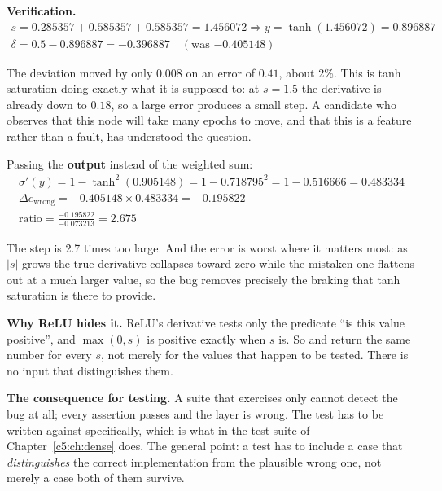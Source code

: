 \textbf{Verification.}
\begin{gather*}
  s = 0.285357 + 0.585357 + 0.585357 = 1.456072 \Rightarrow y = \tanh(1.456072) = 0.896887 \\
  \delta = 0.5 - 0.896887 = \mathbf{-0.396887} \quad (\text{was } {-0.405148})
\end{gather*}

The deviation moved by only $0.008$ on an error of $0.41$, about 2\%. This is tanh saturation doing
exactly what it is supposed to: at $s = 1.5$ the derivative is already down to $0.18$, so a large
error produces a small step. A candidate who observes that this node will take many epochs to move,
and that this is a feature rather than a fault, has understood the question.

Passing the \textbf{output} instead of the weighted sum:
\begin{gather*}
  \sigma'(y) = 1 - \tanh^2(0.905148) = 1 - 0.718795^2 = 1 - 0.516666 = \mathbf{0.483334} \\
  \Delta e_{\mathrm{wrong}} = -0.405148 \times 0.483334 = \mathbf{-0.195822} \\
  \text{ratio} = \frac{-0.195822}{-0.073213} = \mathbf{2.675}
\end{gather*}

The step is 2.7 times too large. And the error is worst where it matters most: as
$\lvert s \rvert$ grows the true derivative collapses toward zero while the mistaken one flattens
out at a much larger value, so the bug removes precisely the braking that tanh saturation is there
to provide.

\textbf{Why ReLU hides it.} ReLU's derivative tests only the predicate ``is this value positive'',
and $\max(0, s)$ is positive exactly when $s$ is. So  and
 return the same number for every $s$, not merely for the values that
happen to be tested. There is no input that distinguishes them. 

\textbf{The consequence for testing.} A suite that exercises only  cannot detect the bug
at all; every assertion passes and the layer is wrong. The test has to be written against
 specifically, which is what  in the test
suite of Chapter~\ref{c5:ch:dense} does. The general point: a test has to include a case that
\emph{distinguishes} the correct implementation from the plausible wrong one, not merely a case both
of them survive. 

